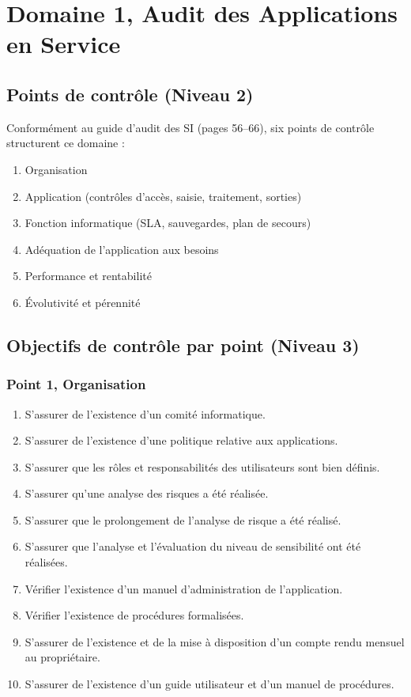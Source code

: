 \section{Domaine 1, Audit des Applications en Service}
\label{sec:decomp-appli}

\subsection{Points de contrôle (Niveau 2)}

Conformément au guide d'audit des SI (pages 56--66), six points de contrôle structurent ce domaine :

\begin{enumerate}
    \item Organisation
    \item Application (contrôles d'accès, saisie, traitement, sorties)
    \item Fonction informatique (SLA, sauvegardes, plan de secours)
    \item Adéquation de l'application aux besoins
    \item Performance et rentabilité
    \item Évolutivité et pérennité
\end{enumerate}

\subsection{Objectifs de contrôle par point (Niveau 3)}

\subsubsection{Point 1, Organisation}

\begin{enumerate}[label=1.\arabic*.]
    \item S'assurer de l'existence d'un comité informatique.
    \item S'assurer de l'existence d'une politique relative aux applications.
    \item S'assurer que les rôles et responsabilités des utilisateurs sont bien définis.
    \item S'assurer qu'une analyse des risques a été réalisée.
    \item S'assurer que le prolongement de l'analyse de risque a été réalisé.
    \item S'assurer que l'analyse et l'évaluation du niveau de sensibilité ont été réalisées.
    \item Vérifier l'existence d'un manuel d'administration de l'application.
    \item Vérifier l'existence de procédures formalisées.
    \item S'assurer de l'existence et de la mise à disposition d'un compte rendu mensuel au propriétaire.
    \item S'assurer de l'existence d'un guide utilisateur et d'un manuel de procédures.
\end{enumerate}

